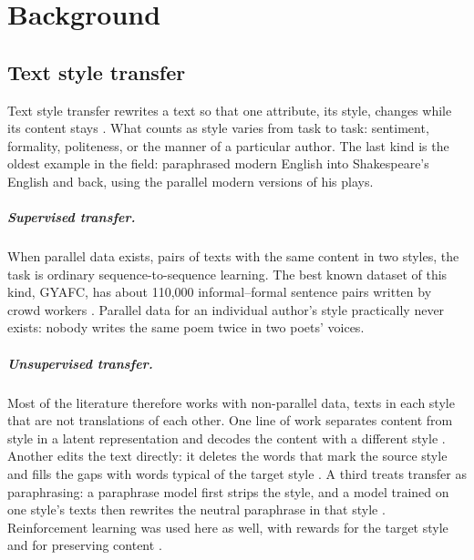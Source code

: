 \chapter{Background}\label{ch:background}

\section{Text style transfer}

Text style transfer rewrites a text so that one attribute, its style,
changes while its content stays \citep{jin2022survey}. What counts as style
varies from task to task: sentiment, formality, politeness, or the manner of
a particular author. The last kind is the oldest example in the field:
\citet{xu2012shakespeare} paraphrased modern English into Shakespeare's
English and back, using the parallel modern versions of his plays.

\paragraph{Supervised transfer.} When parallel data exists, pairs of texts
with the same content in two styles, the task is ordinary sequence-to-sequence
learning. The best known dataset of this kind, GYAFC, has about 110,000
informal--formal sentence pairs written by crowd workers
\citep{rao2018gyafc}. Parallel data for an individual author's style
practically never exists: nobody writes the same poem twice in two poets'
voices.

\paragraph{Unsupervised transfer.} Most of the literature therefore works
with non-parallel data, texts in each style that are not translations of
each other. One line of work separates content from style in a latent
representation and decodes the content with a different style
\citep{shen2017crossalign}. Another edits the text directly: it deletes the
words that mark the source style and fills the gaps with words typical of
the target style \citep{li2018delete}. A third treats transfer as
paraphrasing: a paraphrase model first strips the style, and a model trained
on one style's texts then rewrites the neutral paraphrase in that style
\citep{krishna2020strap}. Reinforcement learning was used here as well, with
rewards for the target style and for preserving content
\citep{luo2019dualrl}.

